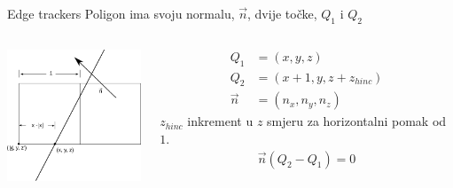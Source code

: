 \documentclass[9pt]{beamer}
\begin{document}
\begin{frame}{Edge trackers}
	Poligon ima svoju normalu, $\vec{n}$, dvije točke, $Q_1$ i $Q_2$
	\begin{columns}[t]
		\begin{column}{0.48 \textwidth}
			\begin{center}
				\includegraphics[height=4cm]{slike/p05_12.png}
			\end{center}
		\end{column}
		\begin{column}{0.48 \textwidth}
			\begin{align*}
			Q_1 &= (x, y, z)\\
			Q_2 &= (x+1, y, z+z_{hinc})\\
			\vec{n} &= (n_x, n_y, n_z)
			\end{align*}
			$z_{hinc}$ inkrement u $z$ smjeru za horizontalni pomak od $1$.
			\begin{align*}
			\vec{n}\left(Q_2-Q_1\right) = 0
			\end{align*}
		\end{column}
	\end{columns}
\end{frame}
\end{document}
